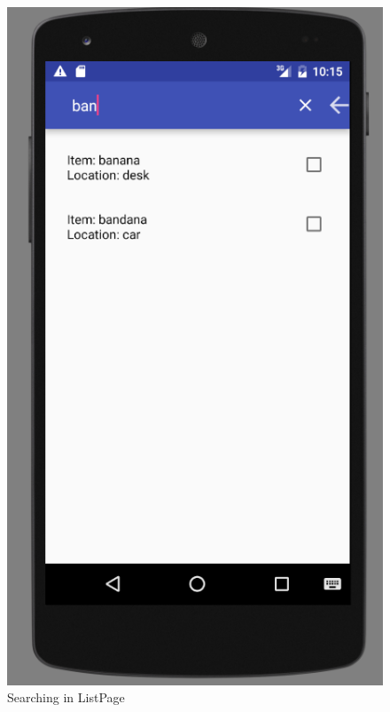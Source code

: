 \documentclass{article}
\begin{document}
\begin{figure}[h!]
	\centering
	\includegraphics[scale=0.7]{"ListPageSearch"}
	\caption{Searching in ListPage}
	\label{fig:ListPageSearch}
\end{figure}
\end{document}
